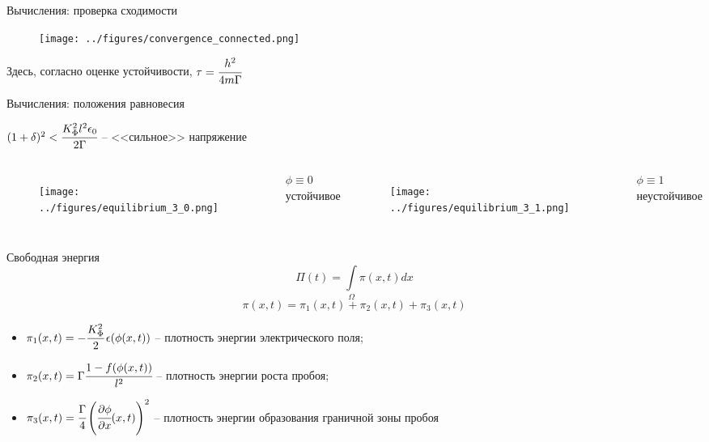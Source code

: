 \documentclass{beamer}
\begin{document}
\begin{frame}{Вычисления: проверка сходимости}
\vspace{-0.2cm}
\begin{figure}
	\texttt{[image: ../figures/convergence\_connected.png]}
\end{figure}
\vspace{-0.8cm}
\begin{center}
	\hspace{-0.4cm}
	Здесь, согласно оценке устойчивости, $\tau = \cfrac{h^2}{4m \Gamma}$
\end{center}
\end{frame}


\begin{frame}{Вычисления: положения равновесия}
\begin{center}
	$(1 + \delta)^2 < \cfrac{K_\Phi^2 l^2 \epsilon_0}{2 \Gamma}$ -- <<сильное>> напряжение
\end{center}
\begin{columns}
\begin{figure}
	\texttt{[image: ../figures/equilibrium\_3\_0.png]}
\end{figure}
\begin{center}
	$\phi \equiv 0$ \\
	устойчивое
\end{center}
\begin{figure}
	\texttt{[image: ../figures/equilibrium\_3\_1.png]}
\end{figure}
\begin{center}
	$\phi \equiv 1$ \\
	неустойчивое
\end{center}
\end{columns}
\end{frame}


\begin{frame}{Свободная энергия}
\vspace{-0.5cm}
$$\Pi(t) = \int\limits_\Omega \pi(x, t) dx$$
$$\pi(x, t) = \pi_1(x, t) + \pi_2(x, t) + \pi_3(x, t)$$
\vspace{-0.3cm}
\begin{itemize}
	\item $\pi_1(x, t) = -\cfrac{K_\Phi^2}{2} \, \epsilon(\phi(x, t))$ -- плотность энергии
	электрического поля;
	\item $\pi_2(x, t) = \Gamma \cfrac{1 - f(\phi(x, t))}{l^2}$ -- плотность энергии роста пробоя;
	\item $\pi_3(x, t) = \cfrac{\Gamma}{4} \left( \cfrac{\partial \phi}{\partial x}(x, t)
	\right)^2$ -- плотность энергии образования граничной зоны пробоя
\end{itemize}
\end{frame}
\end{document}
